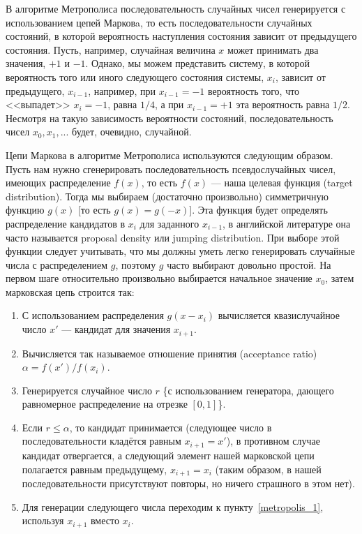 \documentclass{book}
\begin{document}
В алгоритме Метрополиса последовательность случайных чисел генерируется с использованием
цепей Марковa, то есть последовательности случайных состояний, в которой вероятность наступления
состояния зависит от предыдущего состояния. Пусть, например, случайная величина $x$ может принимать
два значения, $+1$ и $-1$. Однако, мы можем представить систему, в которой вероятность того или
иного следующего состояния
системы, $x_i$, зависит от предыдущего, $x_{i - 1}$, например, при $x_{i - 1} = -1$ вероятность
того, что <<выпадет>> $x_i = -1$, равна $1/4$, а при $x_{i - 1} = +1$ эта вероятность равна $1/2$.
Несмотря на такую зависимость вероятности состояний, последовательность чисел $x_0, x_1,...$ будет,
очевидно, случайной.

Цепи Маркова в алгоритме Метрополиса используются следующим образом. Пусть нам нужно сгенерировать
последовательность псевдослучайных чисел, имеющих распределение $f(x)$, то есть $f(x)$ --- наша
целевая функция (target distribution). Тогда мы выбираем (достаточно произвольно) симметричную
функцию $g(x)$ [то есть $g(x) = g(-x)$]. Эта функция будет определять распределение кандидатов в
$x_i$ для заданного $x_{i - 1}$, в английской литературе она часто называется proposal density или
jumping distribution. При выборе этой функции следует учитывать, что мы должны уметь легко
генерировать случайные числа с распределением $g$, поэтому $g$ часто выбирают довольно простой. На
первом шаге относительно произвольно выбирается начальное значение $x_0$, затем марковская цепь
строится так:
\begin{enumerate}
    \item \label{metropolis_1} С использованием распределения $g(x-x_i)$ вычисляется квазислучайное
        число $x'$ --- кандидат для значения $x_{i + 1}$.
    \item Вычисляется так называемое отношение принятия (acceptance ratio) $\alpha = f(x') / f(x_i)$.
    \item Генерируется случайное число $r$ \{с использованием генератора, дающего равномерное
        распределение на отрезке $[0, 1]$\}.
    \item \label{metropolis_acceptance} Если $r \leq \alpha$, то кандидат принимается (следующее
        число в последовательности кладётся равным $x_{i + 1} = x'$), в противном случае кандидат
        отвергается, а следующий элемент нашей марковской цепи полагается равным предыдущему, $x_{i
        + 1} = x_i$ (таким образом, в нашей последовательности присутствуют повторы, но ничего
        страшного в этом нет).
    \item Для генерации следующего числа переходим к пункту~\ref{metropolis_1}, используя $x_{i +
        1}$ вместо $x_i$.
\end{enumerate}
\end{document}
